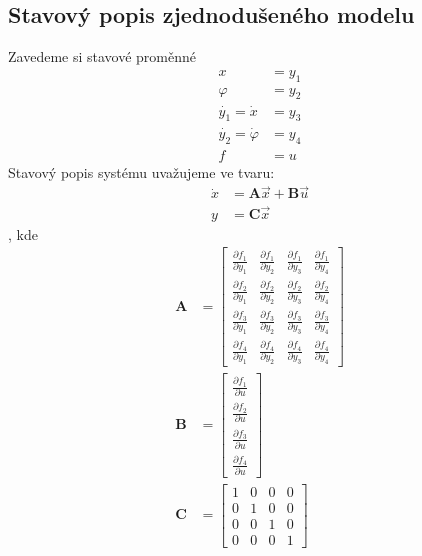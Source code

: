 \documentclass[a4paper, 12pt]{article}
\begin{document}
		\subsection{Stavový popis zjednodušeného modelu}
			Zavedeme si stavové proměnné
			\begin{align*}
				x &= y_1\\
				\varphi &= y_2\\
				\dot{y_1} = \dot{x} &= y_3\\
				\dot{y_2} = \dot{\varphi} &= y_4\\
				f &= u
			\end{align*}
			Stavový popis systému uvažujeme ve tvaru:
			\begin{align*}
				\dot{x} &= \mathbf{A}\vec{x}+\mathbf{B}\vec{u}\\
				y &= \mathbf{C}\vec{x}   %
			\end{align*}
			, kde 
			\begin{align*}
				\mathbf{A} &= \left[\begin{matrix}
					\frac{\partial f_1}{\partial y_1} & \frac{\partial f_1}{\partial y_2} & \frac{\partial f_1}{\partial y_3} & \frac{\partial f_1}{\partial y_4}\\
					\frac{\partial f_2}{\partial y_1} & \frac{\partial f_2}{\partial y_2} & \frac{\partial f_2}{\partial y_3} & \frac{\partial f_2}{\partial y_4}\\
					\frac{\partial f_3}{\partial y_1} & \frac{\partial f_3}{\partial y_2} & \frac{\partial f_3}{\partial y_3} & \frac{\partial f_3}{\partial y_4}\\
					\frac{\partial f_4}{\partial y_1} & \frac{\partial f_4}{\partial y_2} & \frac{\partial f_4}{\partial y_3} & \frac{\partial f_4}{\partial y_4}	
				\end{matrix}\right]\\
				\mathbf{B} &= \left[\begin{matrix}
					\frac{\partial f_1}{\partial u}\\
					\frac{\partial f_2}{\partial u}\\
					\frac{\partial f_3}{\partial u}\\
					\frac{\partial f_4}{\partial u}
				\end{matrix}\right]\\
				\mathbf{C} &= \left[\begin{matrix}
					1 & 0 & 0 & 0\\
					0 & 1 & 0 & 0\\
					0 & 0 & 1 & 0\\
					0 & 0 & 0 & 1
				\end{matrix}\right]
			\end{align*}
\end{document}
